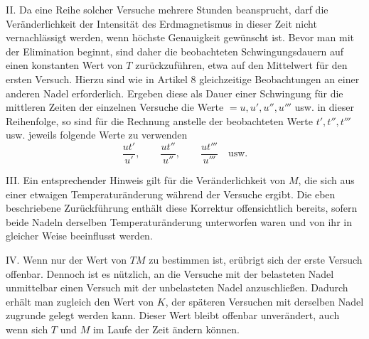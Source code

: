 II. Da eine Reihe solcher Versuche mehrere Stunden beansprucht, darf die Veränderlichkeit der Intensität des Erdmagnetismus in dieser Zeit nicht vernachlässigt werden, wenn höchste Genauigkeit gewünscht ist. Bevor man mit der Elimination beginnt, sind daher die beobachteten Schwingungsdauern auf einen konstanten Wert von $T$ zurückzuführen, etwa auf den Mittelwert für den ersten Versuch. Hierzu sind wie in Artikel 8 gleichzeitige Beobachtungen an einer anderen Nadel erforderlich. Ergeben diese als Dauer einer Schwingung für die mittleren Zeiten der einzelnen Versuche die Werte $=u,u',u'',u'''$ usw. in dieser Reihenfolge, so sind für die Rechnung anstelle der beobachteten Werte $t',t'',t'''$ usw. jeweils folgende Werte zu verwenden
\[
\frac{ut'}{u'},\qquad\frac{ut''}{u''},\qquad\frac{ut'''}{u'''}\quad\text{usw.}
\]

III. Ein entsprechender Hinweis gilt für die Veränderlichkeit von $M$, die sich aus einer etwaigen Temperaturänderung während der Versuche ergibt. Die eben beschriebene Zurückführung enthält diese Korrektur offensichtlich bereits, sofern beide Nadeln derselben Temperaturänderung unterworfen waren und von ihr in gleicher Weise beeinflusst werden.

IV. Wenn nur der Wert von $TM$ zu bestimmen ist, erübrigt sich der erste Versuch offenbar. Dennoch ist es nützlich, an die Versuche mit der belasteten Nadel unmittelbar einen Versuch mit der unbelasteten Nadel anzuschließen. Dadurch erhält man zugleich den Wert von $K$, der späteren Versuchen mit derselben Nadel zugrunde gelegt werden kann. Dieser Wert bleibt offenbar unverändert, auch wenn sich $T$ und $M$ im Laufe der Zeit ändern können.
